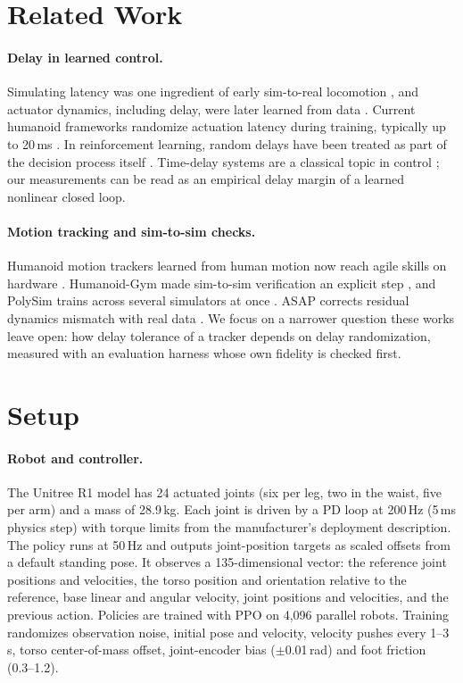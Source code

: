 \documentclass{l4dc2026}
\begin{document}
\section{Related Work}

\paragraph{Delay in learned control.}
Simulating latency was one ingredient of early sim-to-real locomotion \citep{tan2018simtoreal}, and actuator dynamics, including delay, were later learned from data \citep{hwangbo2019learning}.
Current humanoid frameworks randomize actuation latency during training, typically up to 20\,ms \citep{wang2025booster,seo2025learning}.
In reinforcement learning, random delays have been treated as part of the decision process itself \citep{bouteiller2021reinforcement}.
Time-delay systems are a classical topic in control \citep{richard2003time}; our measurements can be read as an empirical delay margin of a learned nonlinear closed loop.

\paragraph{Motion tracking and sim-to-sim checks.}
Humanoid motion trackers learned from human motion now reach agile skills on hardware \citep{liao2025beyondmimic,he2025asap,allshire2025visual}.
Humanoid-Gym made sim-to-sim verification an explicit step \citep{gu2024humanoid}, and PolySim trains across several simulators at once \citep{lei2025polysim}.
ASAP corrects residual dynamics mismatch with real data \citep{he2025asap}.
We focus on a narrower question these works leave open: how delay tolerance of a tracker depends on delay randomization, measured with an evaluation harness whose own fidelity is checked first.

\section{Setup}
\label{sec:setup}

\paragraph{Robot and controller.}
The Unitree R1 model has 24 actuated joints (six per leg, two in the waist, five per arm) and a mass of 28.9\,kg.
Each joint is driven by a PD loop at 200\,Hz (5\,ms physics step) with torque limits from the manufacturer's deployment description.
The policy runs at 50\,Hz and outputs joint-position targets as scaled offsets from a default standing pose.
It observes a 135-dimensional vector: the reference joint positions and velocities, the torso position and orientation relative to the reference, base linear and angular velocity, joint positions and velocities, and the previous action.
Policies are trained with PPO \citep{schulman2017proximal} on 4,096 parallel robots.
Training randomizes observation noise, initial pose and velocity, velocity pushes every 1--3\,s, torso center-of-mass offset, joint-encoder bias ($\pm$0.01\,rad) and foot friction (0.3--1.2).
\end{document}
